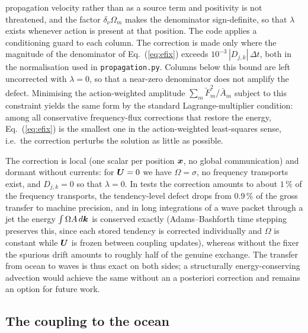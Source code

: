 \documentclass[12pt]{article}
\newcommand{\eq }  [1]{Eq.~(\ref{#1})}  %
\renewcommand{\v}[1]{{\mbox{\boldmath$ #1 $}}}  %
\begin{document}
propagation velocity rather than as a source term and positivity is not
threatened, and the factor $\delta_\nu \Omega_m$ makes the denominator
sign-definite, so that $\lambda$ exists whenever action is present at that
position.
The code applies a conditioning guard to each column.
The correction is made only where the magnitude of the denominator of
\eq{eq:efix} exceeds $10^{-3} \, |D_{j,k}| \, \Delta t$, both in the
normalisation used in \verb|propagation.py|.
Columns below this bound are left uncorrected with $\lambda = 0$, so that a
near-zero denominator does not amplify the defect. Minimising the action-weighted amplitude
$\sum_m \tilde{F}_m^2 / \bar A_m$ subject to this constraint yields the same
form by the standard Lagrange-multiplier condition: among all conservative
frequency-flux corrections that restore the energy, \eq{eq:efix} is the
smallest one in the action-weighted least-squares sense, i.e.\ the correction
perturbs the solution as little as possible.

The correction is local (one scalar per position $\v x$, no global
communication) and dormant without currents: for $\v U = 0$ we have
$\Omega = \sigma$, no frequency transports exist, and $D_{j,k} = 0$ so that
$\lambda = 0$. In tests the correction amounts to about $1 \, \%$ of the
frequency transports, the tendency-level defect drops from $0.9 \, \%$ of the
gross transfer to machine precision, and in long integrations of a wave
packet through a jet the energy $\int \Omega A \, d \v k$ is conserved
exactly (Adams--Bashforth time stepping preserves this, since each stored
tendency is corrected individually and $\Omega$ is constant while $\v U$ is
frozen between coupling updates), whereas without the fixer the spurious
drift amounts to roughly half of the genuine exchange. The transfer from
ocean to waves is thus exact on both sides; a structurally energy-conserving
advection would achieve the same without an a posteriori correction and
remains an option for future work.
   
 \subsection*{The coupling to the ocean}
 
\end{document}
